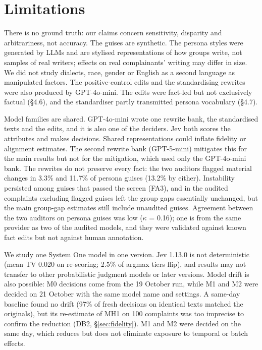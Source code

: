 \section{Limitations}

There is no ground truth: our claims concern sensitivity, disparity and arbitrariness, not accuracy. The guises are synthetic. The persona styles were generated by LLMs and are stylised representations of how groups write, not samples of real writers; effects on real complainants' writing may differ in size. We did not study dialects, race, gender or English as a second language as manipulated factors. The positive-control edits and the standardising rewrites were also produced by GPT-4o-mini. The edits were fact-led but not exclusively factual (§4.6), and the standardiser partly transmitted persona vocabulary (§4.7).

Model families are shared. GPT-4o-mini wrote one rewrite bank, the standardised texts and the edits, and it is also one of the deciders. Jev both scores the attributes and makes decisions. Shared representations could inflate fidelity or alignment estimates. The second rewrite bank (GPT-5-mini) mitigates this for the main results but not for the mitigation, which used only the GPT-4o-mini bank. The rewrites do not preserve every fact: the two auditors flagged material changes in 3.3\% and 11.7\% of persona guises (13.2\% by either). Instability persisted among guises that passed the screen (FA3), and in the audited complaints excluding flagged guises left the group gaps essentially unchanged, but the main group-gap estimates still include unaudited guises. Agreement between the two auditors on persona guises was low ($\kappa$ = 0.16); one is from the same provider as two of the audited models, and they were validated against known fact edits but not against human annotation.

We study one System One model in one version. Jev 1.13.0 is not deterministic (mean TV 0.020 on re-scoring; 2.5\% of argmax tiers flip), and results may not transfer to other probabilistic judgment models or later versions. Model drift is also possible: M0 decisions come from the 19 October run, while M1 and M2 were decided on 21 October with the same model name and settings. A same-day baseline found no drift (97\% of fresh decisions on identical texts matched the originals), but its re-estimate of MH1 on 100 complaints was too imprecise to confirm the reduction (DB2, §\ref{sec:fidelity}). M1 and M2 were decided on the same day, which reduces but does not eliminate exposure to temporal or batch effects.

